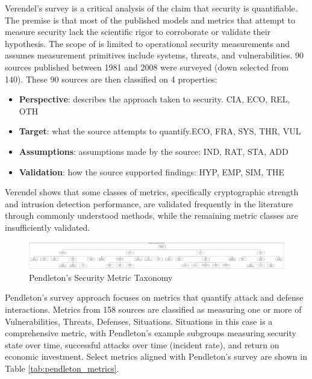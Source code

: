Verendel’s survey\cite{Verendel_2009} is a critical analysis of the claim that security is quantifiable. The premise is that most of the published models and metrics that attempt to measure security lack the scientific rigor to corroborate or validate their hypothesis. 
The scope of \cite{Verendel_2009} is limited to operational security measurements and assumes measurement primitives include systems, threats, and vulnerabilities.
90 sources published between 1981 and 2008 were surveyed (down selected from 140). These 90 sources are then classified on 4 properties: 
\begin{itemize}
\item \textbf{Perspective}: describes the approach taken to security. { CIA, ECO, REL, OTH}
\item \textbf{Target}: what the source attempts to quantify.{ECO, FRA, SYS, THR, VUL}
\item \textbf{Assumptions}: assumptions made by the source: {IND, RAT, STA, ADD}
\item \textbf{Validation}: how the source supported findings: {HYP, EMP, SIM, THE}
\end{itemize}

Verendel shows that some classes of metrics, specifically cryptographic strength and intrusion detection performance, are validated frequently in the literature through commonly understood methods, while the remaining metric classes are insufficiently validated. 

\begin{figure}[ht]
\centering
\includegraphics[width=.95\linewidth]{resource/img/ch_background/cybok_metrics/pendleton_metric_taxonomy_drawio.png}
\caption{Pendleton's Security Metric Taxonomy\cite{Pendleton_Garcia-Lebron_Cho_Xu_2016}}
\label{fig:background:pendleton_taxonomy}
\end{figure} 


Pendleton’s survey\cite{ Pendleton_Garcia-Lebron_Xu_2016, Pendleton_Garcia-Lebron_Cho_Xu_2016} approach focuses on metrics that quantify attack and defense interactions. Metrics from 158 sources are classified as measuring one or more of Vulnerabilities, Threats, Defenses, Situations. Situations in this case is a comprehensive metric, with Pendleton’s example subgroups measuring security state over time, successful attacks over time (incident rate), and return on economic investment. Select metrics aligned with Pendleton's survey are shown in Table \ref{tab:pendleton_metrics}.

